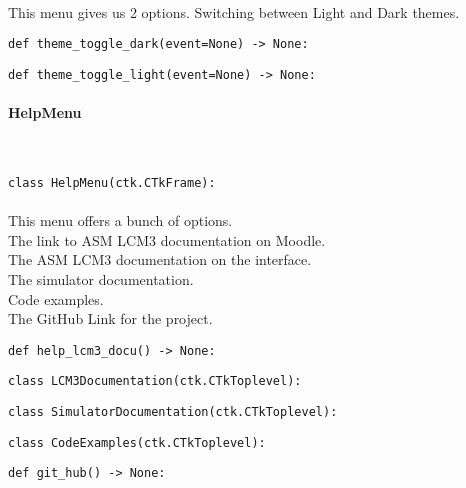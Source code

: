 \documentclass{article}
\newcommand{\subsubsubsection}[1]{\paragraph{#1}\mbox{}\\}
\begin{document}
\paragraph{}

This menu gives us 2 options. Switching between Light and Dark themes. \\

\begin{lstlisting}[language=MyPython]
def theme_toggle_dark(event=None) -> None:
\end{lstlisting}
\begin{lstlisting}[language=MyPython]
def theme_toggle_light(event=None) -> None:
\end{lstlisting}

\paragraph{}
\subsubsubsection{HelpMenu}
\begin{lstlisting}[language=MyPython]
class HelpMenu(ctk.CTkFrame):
\end{lstlisting}
\paragraph{}

This menu offers a bunch of options. \\
The link to ASM LCM3 documentation on Moodle. \\
The ASM LCM3 documentation on the interface. \\
The simulator documentation. \\
Code examples. \\
The GitHub Link for the project. \\

\begin{lstlisting}[language=MyPython]
def help_lcm3_docu() -> None:
\end{lstlisting}
\begin{lstlisting}[language=MyPython]
class LCM3Documentation(ctk.CTkToplevel):
\end{lstlisting}
\begin{lstlisting}[language=MyPython]
class SimulatorDocumentation(ctk.CTkToplevel):
\end{lstlisting}
\begin{lstlisting}[language=MyPython]
class CodeExamples(ctk.CTkToplevel):
\end{lstlisting}
\begin{lstlisting}[language=MyPython]
def git_hub() -> None:
\end{lstlisting}
\end{document}
